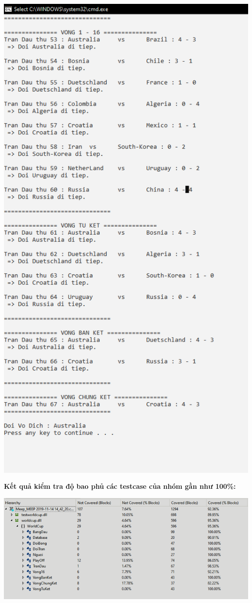 \documentclass[a4paper]{article}
\begin{document}
\begin{center}
\includegraphics[scale=0.6]{hinh28.png}
\end{center}
\newpage
\textbf{Kết quả kiểm tra độ bao phủ các testcase của nhóm gần như 100\%:}
\begin{center}
\includegraphics[scale=0.7]{hinh25.png}
\end{center}
\end{document}
